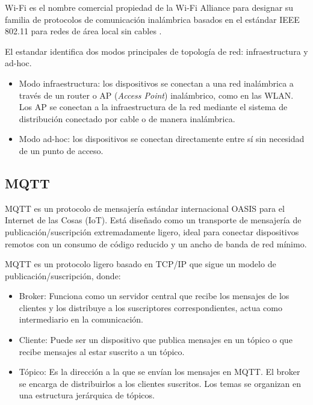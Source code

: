 Wi-Fi es el nombre comercial propiedad de la Wi-Fi Alliance para designar su
familia de protocolos de comunicación inalámbrica basados en el estándar IEEE
802.11 para redes de área local sin cables \cite{Li2019}.

El estandar identifica dos modos principales de topología de red:
infraestructura y ad-hoc.

\begin{itemize}
	\item Modo infraestructura: los dispositivos se conectan a una red inalámbrica a
	      través de un router o AP (\textit{Access Point}) inalámbrico, como en las WLAN.
	      Los AP se conectan a la infraestructura de la red mediante el sistema de
	      distribución conectado por cable o de manera inalámbrica.
	\item Modo ad-hoc: los dispositivos se conectan directamente entre sí sin necesidad
	      de un punto de acceso.
\end{itemize}

\subsection{MQTT}

MQTT es un protocolo de mensajería estándar internacional OASIS
\cite{OASIS_MQTT_Standard} para el Internet de las Cosas (IoT). Está diseñado
como un transporte de mensajería de publicación/suscripción extremadamente
ligero, ideal para conectar dispositivos remotos con un consumo de código
reducido y un ancho de banda de red mínimo.

MQTT es un protocolo ligero basado en TCP/IP \cite{AWS_MQTT} que sigue un
modelo de publicación/suscripción, donde:

\begin{itemize}
	\item Broker: Funciona como un servidor central que recibe los mensajes de los
	      clientes y los distribuye a los suscriptores correspondientes, actua como
	      intermediario en la comunicación.
	\item Cliente: Puede ser un dispositivo que publica mensajes en un tópico o que
	      recibe mensajes al estar suscrito a un tópico.
	\item Tópico: Es la dirección a la que se envían los mensajes en MQTT. El broker se
	      encarga de distribuirlos a los clientes suscritos. Los temas se organizan en
	      una estructura jerárquica de tópicos.
\end{itemize}

